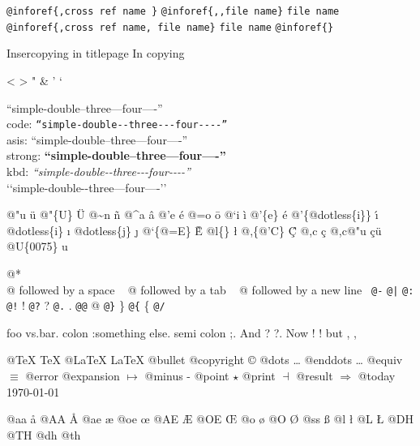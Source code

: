 \documentclass{book}
\begin{document}
\begin{titlepage}
\texttt{@inforef\{,cross ref name \}} 
\texttt{@inforef\{,,file name\}} \texttt{file name}
\texttt{@inforef\{,cross ref name, file name\}} \texttt{file name}
\texttt{@inforef\{\}} 



Insercopying in titlepage
In copying

<
>
"
\&
'
`

``simple-double--three---four----''\leavevmode{}\\
code: \texttt{``simple-double{-}{-}three{-}{-}{-}four{-}{-}{-}-''} \leavevmode{}\\
asis: ``simple-double--three---four----'' \leavevmode{}\\
strong: \textbf{``simple-double--three---four----''} \leavevmode{}\\
kbd: {\ttfamily\textsl{``simple-double{-}{-}three{-}{-}{-}four{-}{-}{-}-''}} \leavevmode{}\\

`\hbox{}`simple-double-\hbox{}-three---four----'\hbox{}'\leavevmode{}\\

%
%
%
%

@"u \"{u} 
@"\{U\} \"{U} 
@\~{}n \~{n}
@\^{}a \^{a}
@'e \'{e}
@=o \={o}
@`i \`{i}
@'\{e\} \'{e}
@'\{@dotless\{i\}\} \'{\i{}} 
@dotless\{i\} \i{}
@dotless\{j\} \j{}
@`\{@=E\} \`{\={E}} 
@l\{\} \l{}
@,\{@'C\} \c{\'{C}}
@,c \c{c}
@,c@"u \c{c}\"{u} \leavevmode{}\\

@U\{0075\} u

@* \leavevmode{}\\
@ followed by a space
\ {}
@ followed by a tab
\ {}
@ followed by a new line
\ {}\texttt{@-} \-{}
\texttt{@|} 
\texttt{@:} \@
\texttt{@!} \@!
\texttt{@?} \@?
\texttt{@.} \@.
\texttt{@@} @
\texttt{@\}} \}
\texttt{@\{} \{
\texttt{@/} 

foo vs.\@ bar. 
colon :\@And something else.
semi colon ;\@.
And ? ?\@.
Now ! !\@@
but , ,\@

@TeX \TeX{}
@LaTeX \LaTeX{}
@bullet \textbullet{}
@copyright \copyright{}
@dots \dots{}\@
@enddots \dots{}
@equiv $\equiv{}$
@error 
@expansion $\mapsto{}$
@minus -
@point $\star{}$
@print $\dashv{}$
@result $\Rightarrow{}$
@today \today{}

@aa \aa{}
@AA \AA{}
@ae \ae{}
@oe \oe{}
@AE \AE{}
@OE \OE{}
@o \o{}
@O \O{}
@ss \ss{}
@l \l{}
@L \L{}
@DH \DH{}
@TH \TH{}
@dh \dh{}
@th \th{}


\end{titlepage}
\end{document}
